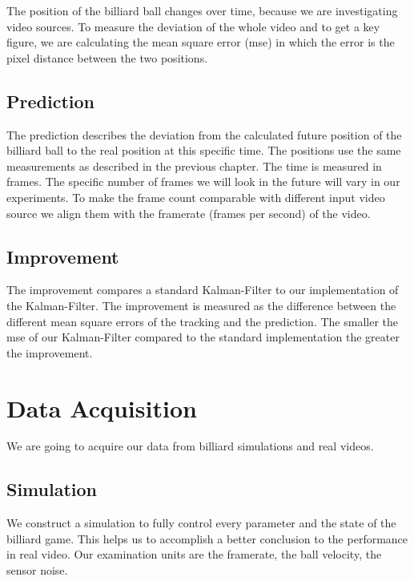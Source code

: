 \documentclass[titlepage, a4paper, 11pt]{scrartcl}
\begin{document}
        The position of the billiard ball changes over time, because we are investigating video sources.
        To measure the deviation of the whole video and to get a key figure, we are calculating the mean square error (mse) in which the error is the pixel distance between the two positions. 

        \subsection{Prediction}

        The prediction describes the deviation from the calculated future position of the billiard ball to the real position at this specific time.
        The positions use the same measurements as described in the previous chapter.
        The time is measured in frames. The specific number of frames we will look in the future will vary in our experiments.
        To make the frame count comparable with different input video source we align them with the framerate (frames per second) of the video.

        \subsection{Improvement}

        The improvement compares a standard Kalman-Filter to our implementation of the Kalman-Filter.
        The improvement is measured as the difference between the different mean square errors of the tracking and the prediction.
        The smaller the mse of our Kalman-Filter compared to the standard implementation the greater the improvement.

    \section{Data Acquisition}

    We are going to acquire our data from billiard simulations and real videos.

        \subsection{Simulation}

        We construct a simulation to fully control every parameter and the state of the billiard game.
        This helps us to accomplish a better conclusion to the performance in real video.
        Our examination units are the framerate, the ball velocity, the sensor noise.
\end{document}
